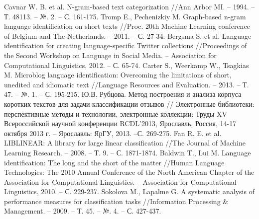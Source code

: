 \documentclass[a4paper, 14pt]{article}
\makeatletter
\renewcommand\appendixname{Приложение}
\def\redeflsection{\def\l@section{\@dottedtocline{1}{1.5em}{7.8em}}}
\renewcommand\appendix{\par
\setcounter{section}{0}%
\setcounter{subsection}{0}%
\def\@chapapp{\appendixname}%
\addtocontents{toc}{\protect\redeflsection}
\def\thesection{\appendixname\hspace{0.2cm}\@arabic\c@section}}
\makeatother
\begin{document}
  \begin{thebibliography}{99}
     Cavnar W. B. et al. N-gram-based text categorization //Ann Arbor MI. – 1994. – Т. 48113. – №. 2. – С. 161-175.
     Tromp E., Pechenizkiy M. Graph-based n-gram language identification on short texts //Proc. 20th Machine Learning conference of Belgium and The Netherlands. – 2011. – С. 27-34.
     Bergsma S. et al. Language identification for creating language-specific Twitter collections //Proceedings of the Second Workshop on Language in Social Media. – Association for Computational Linguistics, 2012. – С. 65-74.
     Carter S., Weerkamp W., Tsagkias M. Microblog language identification: Overcoming the limitations of short, unedited and idiomatic text //Language Resources and Evaluation. – 2013. – Т. 47. – №. 1. – С. 195-215.
     Ю.В. Рубцова. Метод построения и анализа корпуса коротких текстов для задачи классификации отзывов // Электронные библиотеки: перспективные методы и технологии, электронные коллекции: Труды XV Всероссийской научной конференции RCDL’2013, Ярославль, Россия, 14-17 октября 2013 г. – Ярославль: ЯрГУ, 2013. –С. 269-275.
     Fan R. E. et al. LIBLINEAR: A library for large linear classification //The Journal of Machine Learning Research. – 2008. – Т. 9. – С. 1871-1874.
     Baldwin T., Lui M. Language identification: The long and the short of the matter //Human Language Technologies: The 2010 Annual Conference of the North American Chapter of the Association for Computational Linguistics. – Association for Computational Linguistics, 2010. – С. 229-237.
     Sokolova M., Lapalme G. A systematic analysis of performance measures for classification tasks //Information Processing \& Management. – 2009. – Т. 45. – №. 4. – С. 427-437.
  \end{thebibliography}
  
 
  \appendix
  \pagebreak
\end{document}
